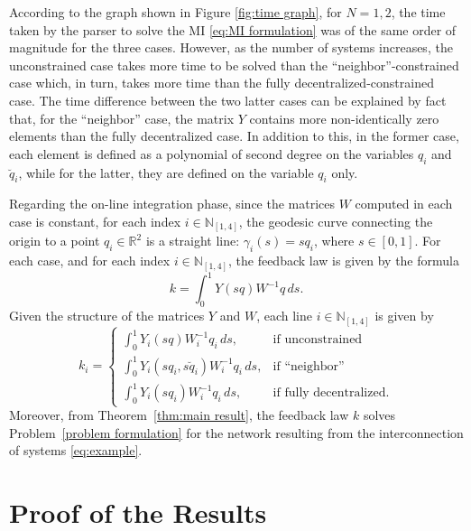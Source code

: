 \documentclass[10pt,twocolumn,twoside]{IEEEtran}
\theoremstyle{plain}
\theoremstyle{definition}
\theoremstyle{remark}
\begin{document}
According to the graph shown in Figure \ref{fig:time graph}, for $N=1,2$, the time taken by the parser to solve the MI \eqref{eq:MI formulation} was of the same order of magnitude for the three cases. However, as the number of systems increases, the unconstrained case takes more time to be solved than the ``neighbor''-constrained case which, in turn, takes more time than the fully decentralized-constrained case. The time difference between the two latter cases can be explained by fact that, for the ``neighbor'' case, the matrix $Y$ contains more non-identically zero elements than the fully decentralized case. In addition to this, in the former case, each element is defined as a polynomial of second degree on the variables $q_i$ and $\breve{q}_i$, while for the latter, they are defined on the variable $q_i$ only.

Regarding the on-line integration phase, since the matrices $W$ computed in each case is  constant, for each index $i\in\mathbb{N}_{[1,4]}$, the geodesic curve connecting the origin to a point $q_i\in\mathbb{R}^2$ is a straight line: $\gamma_i(s)=sq_i$, where $s\in[0,1]$. For each case, and for each index $i\in\mathbb{N}_{[1,4]}$, the feedback law is  given by the formula
\begin{equation*}
	k= \int_0^1Y(sq)W^{-1}q\,ds.
\end{equation*}
Given the structure of the matrices $Y$ and $W$, each line $i\in\mathbb{N}_{[1,4]}$ is given by
\begin{equation*}
k_i=\begin{cases}
	\displaystyle\int_0^1Y_i(sq)W_i^{-1}q_i\,ds,&\text{if unconstrained}\\
	\displaystyle\int_0^1Y_i(sq_i,s\breve{q}_i)W_i^{-1}q_i\,ds,&\text{if ``neighbor''}\\
	\displaystyle\int_0^1Y_i(sq_i)W_i^{-1}q_i\,ds,&\text{if fully decentralized.}
\end{cases}
\end{equation*}
Moreover, from Theorem~\ref{thm:main result}, the feedback law $k$ solves Problem~\ref{problem formulation} for the network resulting from the interconnection of systems \eqref{eq:example}.


\section{Proof of the Results}\label{sec:Proof of the Results}
\end{document}
